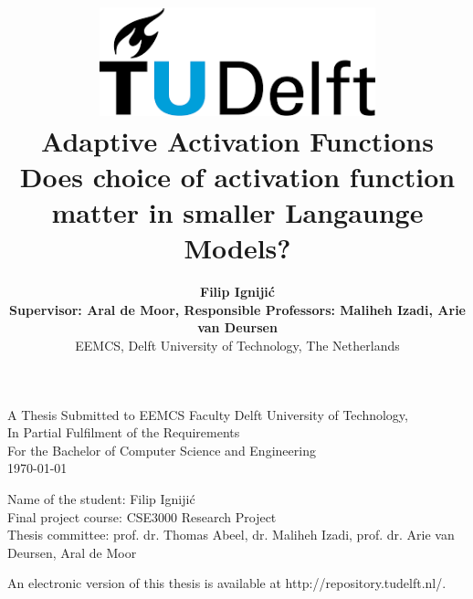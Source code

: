 \title{
    \includegraphics[width=8cm, keepaspectratio]{tudelftlogo.png}\\
    \vspace*{2cm}
    \textbf{
         Adaptive Activation Functions\\
        {\large Does choice of activation function matter in smaller Langaunge Models?}
    }\\
    \vspace*{1cm}
}

\author{
     \textbf{Filip Ignijić}\\
    \hfill \break
    \textbf{Supervisor: Aral de Moor, Responsible Professors: Maliheh Izadi, Arie van Deursen}\\
    \break
    {\large 
        \hfill \break
        EEMCS, Delft University of Technology, The Netherlands
    }\\
}

\date{}

\maketitle
\thispagestyle{empty}

\let\clearpagebackup\clearpage
\renewcommand{\clearpage}{ }

\onecolumn

\vspace*{1.5cm}
\begin{center}
    A Thesis Submitted to EEMCS Faculty Delft University of Technology,\\
    In Partial Fulfilment of the Requirements\\
    For the Bachelor of Computer Science and Engineering\\
    \today
\end{center}

\vspace*{2cm}

\noindent
{\small
Name of the student: Filip Ignijić\\
Final project course: CSE3000 Research Project\\
Thesis committee: prof. dr. Thomas Abeel, dr. Maliheh Izadi, prof. dr. Arie van Deursen, Aral de Moor \\
}
\vfill

\begin{center}
    An electronic version of this thesis is available at http://repository.tudelft.nl/.
\end{center}

\twocolumn
\let\clearpage\clearpagebackup  
\clearpage
\setcounter{page}{1}
